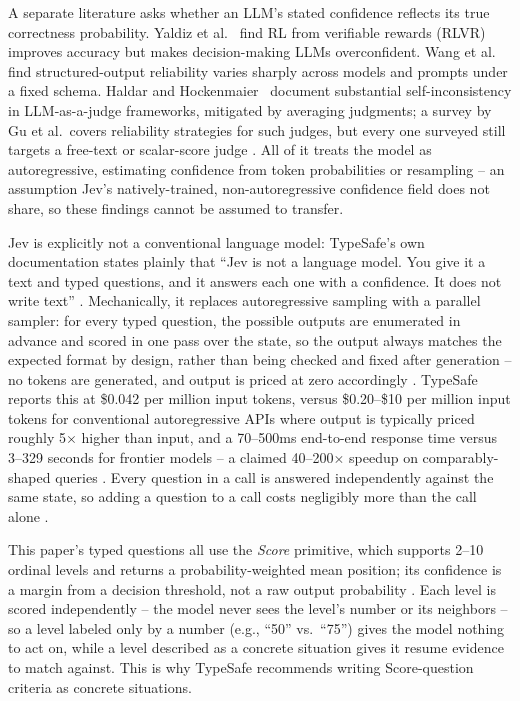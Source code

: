 \documentclass[journal]{IEEEtran}
\begin{document}
A separate literature asks whether an LLM's stated confidence reflects its true correctness probability. Yaldiz et al.~\cite{ref10} find RL from verifiable rewards (RLVR) improves accuracy but makes decision-making LLMs overconfident. Wang et al.~\cite{ref11} find structured-output reliability varies sharply across models and prompts under a fixed schema. Haldar and Hockenmaier~\cite{ref12} document substantial self-inconsistency in LLM-as-a-judge frameworks, mitigated by averaging judgments; a survey by Gu et al.\ covers reliability strategies for such judges, but every one surveyed still targets a free-text or scalar-score judge \cite{ref16}. All of it treats the model as autoregressive, estimating confidence from token probabilities or resampling -- an assumption Jev's natively-trained, non-autoregressive confidence field does not share, so these findings cannot be assumed to transfer.

Jev is explicitly not a conventional language model: TypeSafe's own documentation states plainly that ``Jev is not a language model. You give it a text and typed questions, and it answers each one with a confidence. It does not write text'' \cite{ref9}. Mechanically, it replaces autoregressive sampling with a parallel sampler: for every typed question, the possible outputs are enumerated in advance and scored in one pass over the state, so the output always matches the expected format by design, rather than being checked and fixed after generation -- no tokens are generated, and output is priced at zero accordingly \cite{ref5}. TypeSafe reports this at \$0.042 per million input tokens, versus \$0.20--\$10 per million input tokens for conventional autoregressive APIs where output is typically priced roughly 5$\times$ higher than input, and a 70--500ms end-to-end response time versus 3--329 seconds for frontier models -- a claimed 40--200$\times$ speedup on comparably-shaped queries \cite{ref5}. Every question in a call is answered independently against the same state, so adding a question to a call costs negligibly more than the call alone \cite{ref5}.

This paper's typed questions all use the \emph{Score} primitive, which supports 2--10 ordinal levels and returns a probability-weighted mean position; its confidence is a margin from a decision threshold, not a raw output probability \cite{ref9}. Each level is scored independently -- the model never sees the level's number or its neighbors -- so a level labeled only by a number (e.g., ``50'' vs.\ ``75'') gives the model nothing to act on, while a level described as a concrete situation gives it resume evidence to match against. This is why TypeSafe recommends writing Score-question criteria as concrete situations.
\end{document}
